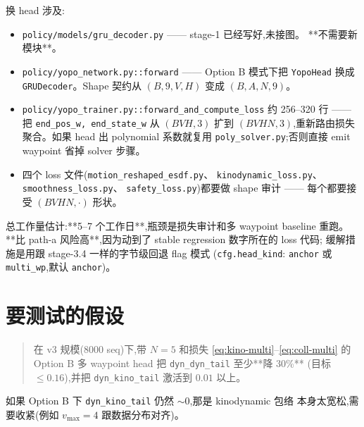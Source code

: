 \documentclass[UTF8, 11pt]{ctexart}
\begin{document}
换 head 涉及:
\begin{itemize}
  \item \texttt{policy/models/gru\_decoder.py} —— stage-1 已经写好,未接图。
        **不需要新模块**。
  \item \texttt{policy/yopo\_network.py::forward} —— Option B 模式下把
        \texttt{YopoHead} 换成 \texttt{GRUDecoder}。Shape 契约从
        $(B, 9, V, H)$ 变成 $(B, A, N, 9)$。
  \item \texttt{policy/yopo\_trainer.py::forward\_and\_compute\_loss}
        约 256--320 行 —— 把 \texttt{end\_pos\_w, end\_state\_w} 从
        $(BVH, 3)$ 扩到 $(BVH N, 3)$,重新路由损失聚合。如果 head 出
        polynomial 系数就复用 \texttt{poly\_solver.py};否则直接 emit
        waypoint 省掉 solver 步骤。
  \item 四个 loss 文件(\texttt{motion\_reshaped\_esdf.py}、
        \texttt{kinodynamic\_loss.py}、\texttt{smoothness\_loss.py}、
        \texttt{safety\_loss.py})都要做 shape 审计 —— 每个都要接受
        $(BVH N, \cdot)$ 形状。
\end{itemize}

总工作量估计:**5--7 个工作日**,瓶颈是损失审计和多 waypoint baseline 重跑。
**比 path-a 风险高**,因为动到了 stable regression 数字所在的 loss 代码;
缓解措施是用跟 stage-3.4 一样的字节级回退 flag 模式
(\texttt{cfg.head\_kind}: \texttt{anchor} 或 \texttt{multi\_wp},默认
\texttt{anchor})。

\section{要测试的假设}

\begin{quote}
  在 v3 规模(8000 seq)下,带 $N=5$ 和损失 \eqref{eq:kino-multi}--\eqref{eq:coll-multi}
  的 Option B 多 waypoint head 把 \texttt{dyn\_dyn\_tail} 至少**降 30\%**
  (目标 $\le 0.16$),并把 \texttt{dyn\_kino\_tail} 激活到 $0.01$ 以上。
\end{quote}

如果 Option B 下 \texttt{dyn\_kino\_tail} 仍然 $\sim$0,那是 kinodynamic 包络
本身太宽松,需要收紧(例如 $v_{\max}=4$ 跟数据分布对齐)。
\end{document}
